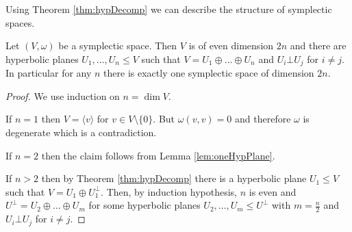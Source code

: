Using Theorem \ref{thm:hypDecomp} we can describe the structure of symplectic spaces.

\begin{corollary}\label{cor:structureSympl}

Let $(V,\omega)$ be a symplectic space. Then $V$ is of even dimension $2n$ and there are hyperbolic planes $U_1,\dots, U_n\leq V$ such that $V=U_1\oplus\dots\oplus U_n$ and $U_i\bot U_j$ for $i\not=j$.
In particular for any $n$ there is exactly one symplectic space of dimension $2n$.
\end{corollary}
\begin{proof}
We use induction on $n=\dim V$.

If $n=1$ then $V=\langle v\rangle$ for $v\in V\setminus\{0\}$. But $\omega(v,v)=0$ and therefore $\omega$ is degenerate which is a contradiction.

If $n=2$ then the claim follows from Lemma \ref{lem:oneHypPlane}.

If $n>2$ then by Theorem \ref{thm:hypDecomp} there is a hyperbolic plane $U_1\leq V$ such that $V=U_1\oplus U_1^\bot$. Then, by induction hypothesis, $n$ is even and $U^\bot =U_2\oplus\dots \oplus U_m$ for some hyperbolic planes $U_2,\dots,U_m\leq U^\bot$ with $m=\frac{n}{2}$ and $U_i\bot U_j$ for $i\not=j$.
\end{proof}


